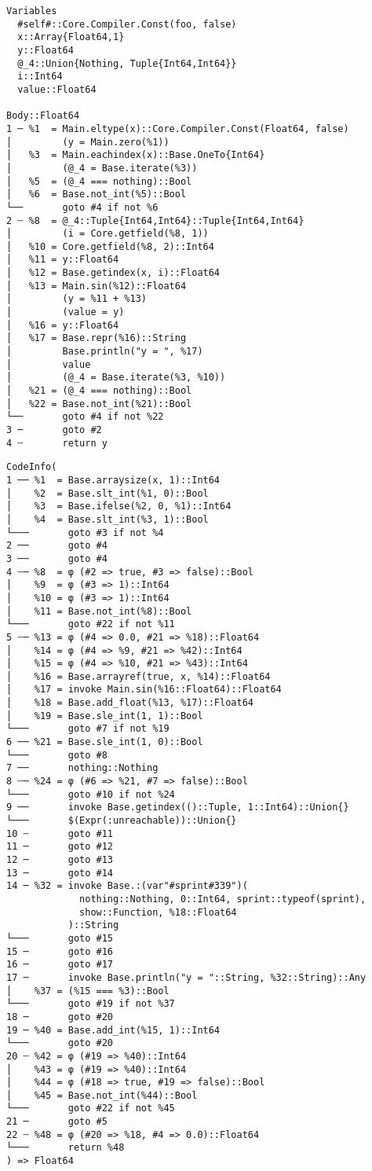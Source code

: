 \begin{lstlisting}
Variables
  #self#::Core.Compiler.Const(foo, false)
  x::Array{Float64,1}
  y::Float64
  @_4::Union{Nothing, Tuple{Int64,Int64}}
  i::Int64
  value::Float64

Body::Float64
1 ─ %1  = Main.eltype(x)::Core.Compiler.Const(Float64, false)
│         (y = Main.zero(%1))
│   %3  = Main.eachindex(x)::Base.OneTo{Int64}
│         (@_4 = Base.iterate(%3))
│   %5  = (@_4 === nothing)::Bool
│   %6  = Base.not_int(%5)::Bool
└──       goto #4 if not %6
2 ┄ %8  = @_4::Tuple{Int64,Int64}::Tuple{Int64,Int64}
│         (i = Core.getfield(%8, 1))
│   %10 = Core.getfield(%8, 2)::Int64
│   %11 = y::Float64
│   %12 = Base.getindex(x, i)::Float64
│   %13 = Main.sin(%12)::Float64
│         (y = %11 + %13)
│         (value = y)
│   %16 = y::Float64
│   %17 = Base.repr(%16)::String
│         Base.println("y = ", %17)
│         value
│         (@_4 = Base.iterate(%3, %10))
│   %21 = (@_4 === nothing)::Bool
│   %22 = Base.not_int(%21)::Bool
└──       goto #4 if not %22
3 ─       goto #2
4 ┄       return y
\end{lstlisting}

\begin{lstlisting}
CodeInfo(
1 ── %1  = Base.arraysize(x, 1)::Int64
│    %2  = Base.slt_int(%1, 0)::Bool
│    %3  = Base.ifelse(%2, 0, %1)::Int64
│    %4  = Base.slt_int(%3, 1)::Bool
└───       goto #3 if not %4
2 ──       goto #4
3 ──       goto #4
4 ┄─ %8  = φ (#2 => true, #3 => false)::Bool
│    %9  = φ (#3 => 1)::Int64
│    %10 = φ (#3 => 1)::Int64
│    %11 = Base.not_int(%8)::Bool
└───       goto #22 if not %11
5 ┄─ %13 = φ (#4 => 0.0, #21 => %18)::Float64
│    %14 = φ (#4 => %9, #21 => %42)::Int64
│    %15 = φ (#4 => %10, #21 => %43)::Int64
│    %16 = Base.arrayref(true, x, %14)::Float64
│    %17 = invoke Main.sin(%16::Float64)::Float64
│    %18 = Base.add_float(%13, %17)::Float64
│    %19 = Base.sle_int(1, 1)::Bool
└───       goto #7 if not %19
6 ── %21 = Base.sle_int(1, 0)::Bool
└───       goto #8
7 ──       nothing::Nothing
8 ┄─ %24 = φ (#6 => %21, #7 => false)::Bool
└───       goto #10 if not %24
9 ──       invoke Base.getindex(()::Tuple, 1::Int64)::Union{}
└───       $(Expr(:unreachable))::Union{}
10 ┄       goto #11
11 ─       goto #12
12 ─       goto #13
13 ─       goto #14
14 ─ %32 = invoke Base.:(var"#sprint#339")(
             nothing::Nothing, 0::Int64, sprint::typeof(sprint),
             show::Function, %18::Float64
           )::String
└───       goto #15
15 ─       goto #16
16 ─       goto #17
17 ─       invoke Base.println("y = "::String, %32::String)::Any
│    %37 = (%15 === %3)::Bool
└───       goto #19 if not %37
18 ─       goto #20
19 ─ %40 = Base.add_int(%15, 1)::Int64
└───       goto #20
20 ┄ %42 = φ (#19 => %40)::Int64
│    %43 = φ (#19 => %40)::Int64
│    %44 = φ (#18 => true, #19 => false)::Bool
│    %45 = Base.not_int(%44)::Bool
└───       goto #22 if not %45
21 ─       goto #5
22 ┄ %48 = φ (#20 => %18, #4 => 0.0)::Float64
└───       return %48
) => Float64
\end{lstlisting}

